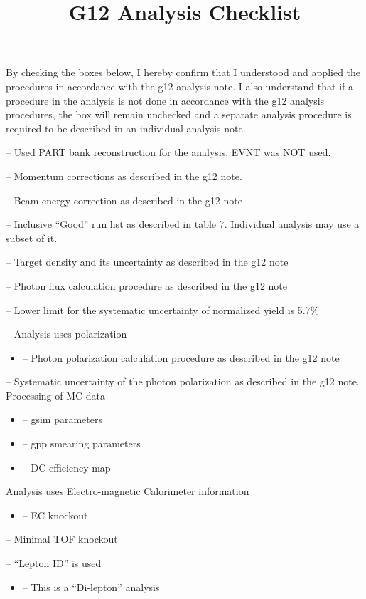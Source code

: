 \documentclass[11pt]{article}
\title{G12 Analysis Checklist}
\date{\vspace{-10ex}}
\let\oldmarginpar\marginpar
\renewcommand\marginpar[1]{\-\oldmarginpar[\raggedleft #1]%
{\raggedright #1}}
\newenvironment{checklist}{%
  \begin{list}{}{}%
  \let\olditem\item
  \renewcommand\item{\olditem -- \marginpar{$\Box$} }
  \newcommand\checkeditem{\olditem -- \marginpar{$\CheckedBox$} }
}{%
  \end{list}
}
\begin{document}
\maketitle
By checking the boxes below, I hereby confirm that I understood and applied the procedures in accordance with the g12 analysis note. I also understand that if a procedure in the analysis is not done in accordance with the g12 analysis procedures, the box will remain unchecked and a separate analysis procedure is required to be described in an individual analysis note.
\begin{checklist}
\item Used PART bank reconstruction for the analysis. EVNT was NOT used.
\item Momentum corrections as described in the g12 note.
\item Beam energy correction as described in the g12 note
\item Inclusive “Good” run list as described in table 7. Individual analysis may use a subset of it.
\item Target density and its uncertainty as described in the g12 note
\item Photon flux calculation procedure as described in the g12 note
\item Lower limit for the systematic uncertainty of normalized yield is 5.7\%
\item Analysis uses polarization
\begin{itemize}[label={}] 
\item Photon polarization calculation procedure as described in the g12 note
\end{itemize}
\item Systematic uncertainty of the photon polarization as described in the g12 note.\\ 
Processing of MC data
\begin{itemize}[label={}]
\item gsim parameters
\item gpp smearing parameters
\item DC efficiency map
\end{itemize}
Analysis uses Electro-magnetic Calorimeter information
\begin{itemize}[label={}]
\item EC knockout
\end{itemize}
\item Minimal TOF knockout
\item “Lepton ID” is used
\begin{itemize}[label={}]
	\item This is a “Di-lepton” analysis
\end{itemize}
\end{checklist}
\end{document}
